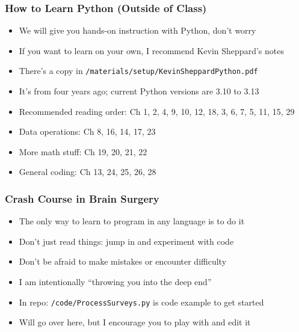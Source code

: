 \documentclass[aspectratio=169]{beamer}
\begin{document}
\begin{frame}
\frametitle{How to Learn Python (Outside of Class)}
\begin{itemize}
\item We will give you hands-on instruction with Python, don't worry

\item If you want to learn on your own, I recommend Kevin Sheppard's notes

\item There's a copy in \texttt{/materials/setup/KevinSheppardPython.pdf}

\item It's from four years ago; current Python versions are 3.10 to 3.13

\item <2->Recommended reading order: Ch 1, 2, 4, 9, 10, 12, 18, 3, 6, 7, 5, 11, 15, 29

\item <2->Data operations: Ch 8, 16, 14, 17, 23

\item <2->More math stuff: Ch 19, 20, 21, 22

\item <2->General coding: Ch 13, 24, 25, 26, 28
\end{itemize}
\end{frame}


\begin{frame}
\frametitle{Crash Course in Brain Surgery}

\begin{itemize}
	\item The only way to learn to program in any language is to do it
	
	\item Don't just read things: jump in and experiment with code
	
	\item <2->Don't be afraid to make mistakes or encounter difficulty
	
	\item <2->I am intentionally ``throwing you into the deep end''
	
	\item <3->In repo: \texttt{/code/ProcessSurveys.py} is code example to get started
	
	\item <3->Will go over here, but I encourage you to play with and edit it
\end{itemize}
\end{frame}
\end{document}
